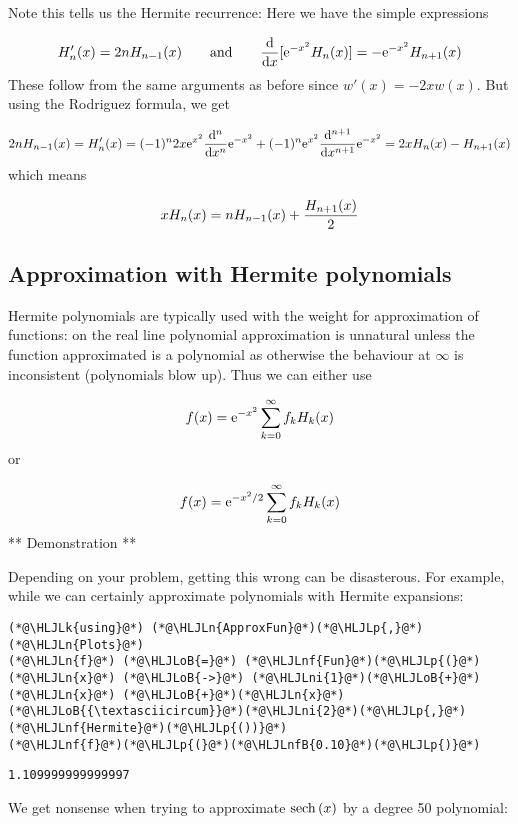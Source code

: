 \documentclass[12pt,a4paper]{article}
\newcommand{\HLJLk}[1]{\textcolor[RGB]{148,91,176}{\textbf{#1}}}
\newcommand{\HLJLn}[1]{#1}
\newcommand{\HLJLnf}[1]{\textcolor[RGB]{66,102,213}{#1}}
\newcommand{\HLJLnfB}[1]{\textcolor[RGB]{59,151,46}{#1}}
\newcommand{\HLJLni}[1]{\textcolor[RGB]{59,151,46}{#1}}
\newcommand{\HLJLoB}[1]{\textcolor[RGB]{102,102,102}{\textbf{#1}}}
\newcommand{\HLJLp}[1]{#1}
\def\qqand{\qquad\hbox{and}\qquad}
\def\D{ {\rm d} }
\def\E{ {\rm e} }
\def\sech{ {\rm sech}\, }
\def\dx{\D x}
\begin{document}
Note this tells us the Hermite recurrence: Here we have the simple expressions

\[
H_n'(x) = 2n H_{n-1}(x) \qqand {\D \over \dx}[\E^{-x^2} H_n(x)] = -\E^{-x^2} H_{n+1}(x)
\]
These follow from the same arguments as before since $w'(x) = -2x w(x)$. But using the Rodriguez formula, we get

\[
2n H_{n-1}(x)  = H_{n}'(x) = (-1)^{n} 2 x  \E^{x^2}  {\D^{n} \over \dx^{n}} \E^{-x^2}  + (-1)^n \E^{x^2}  {\D^{n+1} \over \dx^{n+1}} \E^{-x^2} = 2x H_n(x) - H_{n+1}(x)
\]
which means

\[
x H_n(x) = nH_{n-1}(x) +{H_{n+1}(x) \over 2}
\]
\subsection{Approximation with Hermite polynomials}
Hermite polynomials are typically used with the weight for approximation of functions: on the real line polynomial approximation is unnatural unless  the function approximated is a polynomial as otherwise the behaviour at \ensuremath{\infty} is inconsistent (polynomials blow up).  Thus we can either use

\[
f(x) = \E^{-x^2}\sum_{k=0}^\infty f_k H_k(x)
\]
or

\[
f(x) = \E^{-x^2/2}\sum_{k=0}^\infty f_k H_k(x)
\]
** Demonstration **

Depending on your problem, getting this wrong can be disasterous. For example, while we can certainly approximate polynomials with Hermite expansions:


\begin{lstlisting}
(*@\HLJLk{using}@*) (*@\HLJLn{ApproxFun}@*)(*@\HLJLp{,}@*) (*@\HLJLn{Plots}@*)
(*@\HLJLn{f}@*) (*@\HLJLoB{=}@*) (*@\HLJLnf{Fun}@*)(*@\HLJLp{(}@*)(*@\HLJLn{x}@*) (*@\HLJLoB{->}@*) (*@\HLJLni{1}@*)(*@\HLJLoB{+}@*)(*@\HLJLn{x}@*) (*@\HLJLoB{+}@*)(*@\HLJLn{x}@*)(*@\HLJLoB{{\textasciicircum}}@*)(*@\HLJLni{2}@*)(*@\HLJLp{,}@*) (*@\HLJLnf{Hermite}@*)(*@\HLJLp{())}@*)
(*@\HLJLnf{f}@*)(*@\HLJLp{(}@*)(*@\HLJLnfB{0.10}@*)(*@\HLJLp{)}@*)
\end{lstlisting}

\begin{lstlisting}
1.109999999999997
\end{lstlisting}


We get nonsense when trying to approximate $\sech(x)$ by a degree 50 polynomial:
\end{document}

